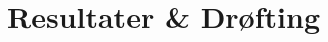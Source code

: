 \documentclass[main.tex]{subfiles}
\begin{document}
\section*{Resultater \& Drøfting}
\label{sec:4}

\end{document}
